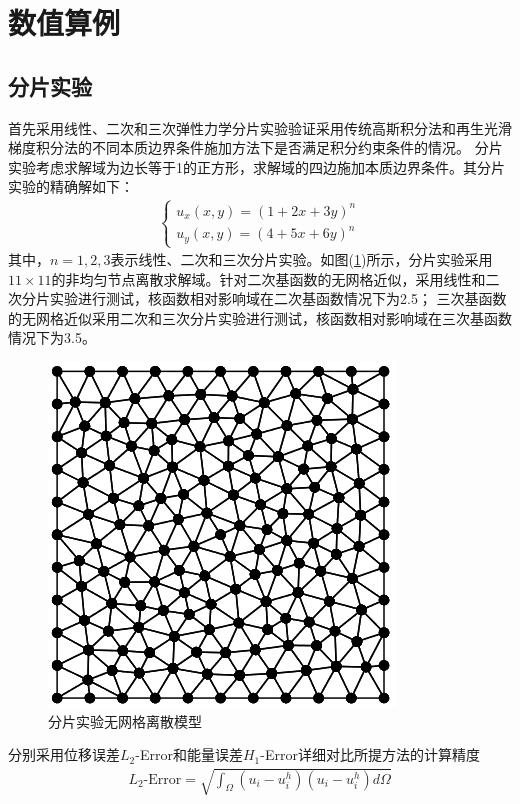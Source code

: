 \section{数值算例}
\subsection{分片实验}
首先采用线性、二次和三次弹性力学分片实验验证采用传统高斯积分法和再生光滑梯度积分法的不同本质边界条件施加方法下是否满足积分约束条件的情况。
分片实验考虑求解域为边长等于1的正方形，求解域的四边施加本质边界条件。其分片实验的精确解如下：
\begin{equation}
\begin{split}
    \begin{cases}
        u_x(x,y)=(1+2x+3y)^n\\
        u_y(x,y)=(4+5x+6y)^n
    \end{cases}
\end{split}
\end{equation}
其中，$n=1,2,3$表示线性、二次和三次分片实验。如图(\ref{patchtestmeshfree})所示，分片实验采用$11\times 11$的非均匀节点离散求解域。针对二次基函数的无网格近似，采用线性和二次分片实验进行测试，核函数相对影响域在二次基函数情况下为2.5；
三次基函数的无网格近似采用二次和三次分片实验进行测试，核函数相对影响域在三次基函数情况下为3.5。\par
\begin{figure}[!h]
    \centering
    \includegraphics[scale=0.7]{figure/patchtestmeshfree.png}
    \caption{分片实验无网格离散模型}\label{patchtestmeshfree}
\end{figure}
分别采用位移误差$L_2$-Error和能量误差$H_1$-Error详细对比所提方法的计算精度
\begin{equation}
\begin{split}
    L_2\text{-Error}=\sqrt{\int_{\Omega}(u_i-u_i^h)(u_i-u_i^h)d\Omega}
\end{split}
\end{equation}
